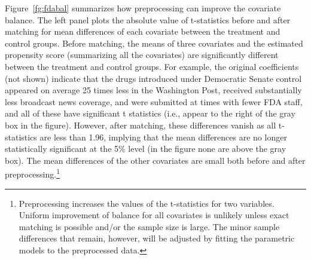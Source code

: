 \documentclass[11pt,titlepage]{article}
\begin{document}
Figure~\ref{fg:fdabal} summarizes how preprocessing can improve the
covariate balance. The left panel plots the absolute value of
t-statistics before and after matching for mean differences of each
covariate between the treatment and control groups.  Before matching,
the means of three covariates and the estimated propensity score
(summarizing all the covariates) are significantly different between
the treatment and control groups.  For example, the original
coefficients (not shown) indicate that the drugs introduced under
Democratic Senate control appeared on average 25 times less in the
Washington Post, received substantially less broadcast news coverage,
and were submitted at times with fewer FDA staff, and all of these
have significant t statistics (i.e., appear to the right of the gray
box in the figure).  However, after matching, these differences vanish
as all t-statistics are less than 1.96, implying that the mean
differences are no longer statistically significant at the 5\% level
(in the figure none are above the gray box).  The mean differences of
the other covariates are small both before and after
preprocessing.\footnote{Preprocessing increases the values of the
  t-statistics for two variables. Uniform improvement of balance for
  all covariates is unlikely unless exact matching is possible and/or
  the sample size is large. The minor sample differences that remain,
  however, will be adjusted by fitting the parametric models to the
  preprocessed data.}
\end{document}
